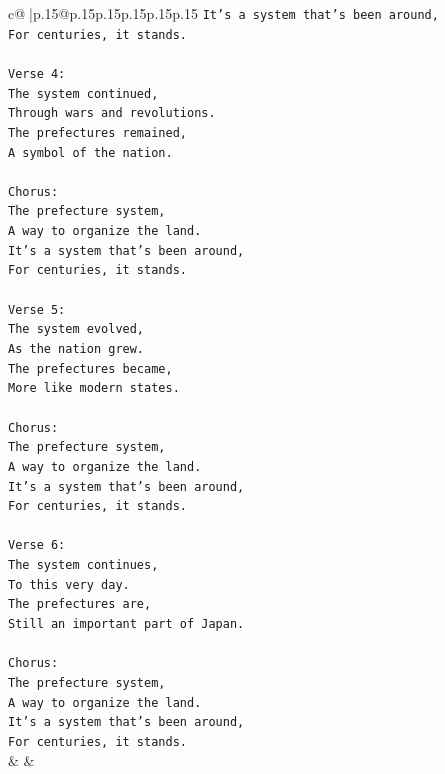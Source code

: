 \documentclass{article}
\begin{document}
{\begin{supertabular}{c@{$\;$}|p{.15\linewidth}@{}p{.15\linewidth}p{.15\linewidth}p{.15\linewidth}p{.15\linewidth}p{.15\linewidth}}
{{{\texttt{It's a system that's been around,} \\
\texttt{For centuries, it stands.} \\
\\ 
\texttt{Verse 4:} \\
\texttt{The system continued,} \\
\texttt{Through wars and revolutions.} \\
\texttt{The prefectures remained,} \\
\texttt{A symbol of the nation.} \\
\\ 
\texttt{Chorus:} \\
\texttt{The prefecture system,} \\
\texttt{A way to organize the land.} \\
\texttt{It's a system that's been around,} \\
\texttt{For centuries, it stands.} \\
\\ 
\texttt{Verse 5:} \\
\texttt{The system evolved,} \\
\texttt{As the nation grew.} \\
\texttt{The prefectures became,} \\
\texttt{More like modern states.} \\
\\ 
\texttt{Chorus:} \\
\texttt{The prefecture system,} \\
\texttt{A way to organize the land.} \\
\texttt{It's a system that's been around,} \\
\texttt{For centuries, it stands.} \\
\\ 
\texttt{Verse 6:} \\
\texttt{The system continues,} \\
\texttt{To this very day.} \\
\texttt{The prefectures are,} \\
\texttt{Still an important part of Japan.} \\
\\ 
\texttt{Chorus:} \\
\texttt{The prefecture system,} \\
\texttt{A way to organize the land.} \\
\texttt{It's a system that's been around,} \\
\texttt{For centuries, it stands.} \\
            }
        }
    }
    & & \\ \\


\end{supertabular}}
\end{document}
